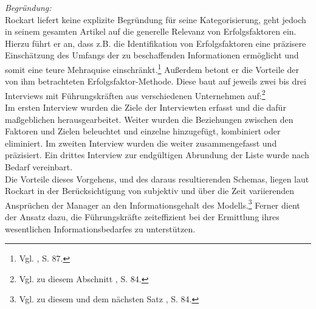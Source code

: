 \textit{Begründung:}\\\noindent
Rockart liefert keine explizite Begründung für seine Kategorisierung, geht jedoch in seinem gesamten Artikel auf die
generelle Relevanz von Erfolgsfaktoren ein. Hierzu führt er an, dass z.B. die Identifikation von Erfolgsfaktoren eine präzisere Einschätzung des Umfangs der zu 
beschaffenden Informationen ermöglicht und somit eine teure Mehraquise einschränkt.\footnote{Vgl. \cite{Rockart.1979}, S. 87.} Außerdem betont er die 
Vorteile der von ihm betrachteten Erfolgsfaktor-Methode. Diese baut auf jeweils zwei bis drei Interviews mit Führungskräften aus verschiedenen Unternehmen auf:\footnote{Vgl. zu diesem Abschnitt \cite{Rockart.1979}, S. 84.}
\\\noindent 
Im ersten Interview wurden die Ziele der Interviewten erfasst und die dafür maßgeblichen \EF herausgearbeitet. 
Weiter wurden die Beziehungen zwischen den Faktoren und Zielen beleuchtet und einzelne \EF hinzugefügt, kombiniert oder eliminiert.
Im zweiten Interview wurden die \EF weiter zusammengefasst und präzisiert. Ein drittes Interview zur endgültigen Abrundung der Liste wurde nach 
Bedarf vereinbart.
\\\noindent
Die Vorteile dieses Vorgehens, und des daraus resultierenden Schemas, liegen laut Rockart in der Berücksichtigung von subjektiv und über die Zeit variierenden 
Ansprüchen der Manager an den Informationsgehalt des Modells.\footnote{Vgl. zu diesem und dem nächsten Satz \cite{Rockart.1979}, S. 84.} Ferner dient der Ansatz
dazu, die Führungskräfte zeiteffizient bei der Ermittlung ihres wesentlichen Informationsbedarfes zu unterstützen.
